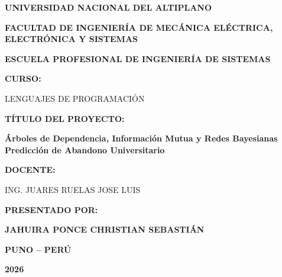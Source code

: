 \documentclass[12pt,a4paper]{article}
\begin{document}
\begin{titlepage}
    \centering
    \setlength{\parindent}{0pt}
    \setlength{\parskip}{0pt}

    {\fontsize{18}{21}\selectfont \textbf{UNIVERSIDAD NACIONAL DEL ALTIPLANO} \par}
    \vspace{0.5cm}
    {\fontsize{16}{19}\selectfont \textbf{FACULTAD DE INGENIERÍA DE MECÁNICA ELÉCTRICA, ELECTRÓNICA Y SISTEMAS} \par}
    \vspace{0.3cm}
    {\fontsize{14}{17}\selectfont \textbf{ESCUELA PROFESIONAL DE INGENIERÍA DE SISTEMAS} \par}

    \vspace{1cm}
    \vspace{1cm}

    {\fontsize{14}{17}\selectfont \textbf{CURSO:} \par}
    {\fontsize{14}{17}\selectfont LENGUAJES DE PROGRAMACIÓN \par}

    \vspace{1cm}
    {\fontsize{14}{17}\selectfont \textbf{TÍTULO DEL PROYECTO:} \par}
    {\fontsize{14}{17}\selectfont \textbf{Árboles de Dependencia, Información Mutua y Redes Bayesianas \\ Predicción de Abandono Universitario} \par}

    \vspace{1cm}
    {\fontsize{14}{17}\selectfont \textbf{DOCENTE:} \par}
    {\fontsize{14}{17}\selectfont ING. JUARES RUELAS JOSE LUIS \par}

    \vspace{1cm}
    {\fontsize{14}{17}\selectfont \textbf{PRESENTADO POR:} \par}
    {\fontsize{16}{19}\selectfont \textbf{JAHUIRA PONCE CHRISTIAN SEBASTIÁN} \par}

    \vfill
    {\fontsize{14}{17}\selectfont \textbf{PUNO -- PERÚ} \par}
    {\fontsize{14}{17}\selectfont \textbf{2026} \par}
\end{titlepage}
\end{document}
